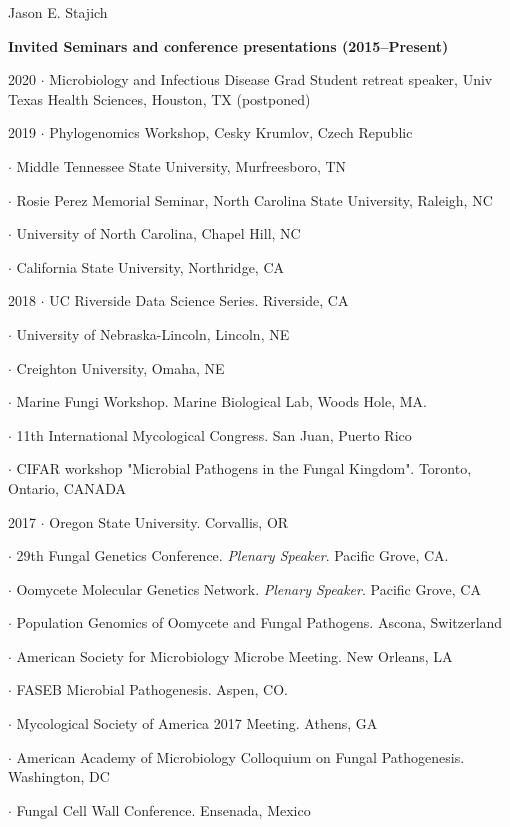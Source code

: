 \documentclass[10pt]{article}
\begin{document}
\begin{cv}{\centerline{Jason E. Stajich}}
\setlength{\cvlabelwidth}{8mm}
\begin{cvlistcompact}{\bf Invited Seminars and conference presentations (2015--Present)}
\item [2020] $\cdot$ Microbiology and Infectious Disease Grad Student retreat speaker, Univ Texas Health Sciences, Houston, TX (postponed)
\item [2019] $\cdot$ Phylogenomics Workshop, Cesky Krumlov, Czech Republic
\item $\cdot$ Middle Tennessee State University, Murfreesboro, TN
\item $\cdot$ Rosie Perez Memorial Seminar, North Carolina State University, Raleigh, NC
\item $\cdot$ University of North Carolina, Chapel Hill, NC
\item $\cdot$ California State University, Northridge, CA
\item [2018] $\cdot$ UC Riverside Data Science Series. Riverside, CA
\item $\cdot$ University of Nebraska-Lincoln, Lincoln, NE
\item $\cdot$ Creighton University, Omaha, NE
\item $\cdot$ Marine Fungi Workshop. Marine Biological Lab, Woods Hole, MA.
\item $\cdot$ 11th International Mycological Congress. San Juan, Puerto Rico
\item $\cdot$ CIFAR workshop "Microbial Pathogens in the Fungal Kingdom". Toronto, Ontario, CANADA
\item [2017] $\cdot$ Oregon State University. Corvallis, OR
\item $\cdot$
  29th Fungal Genetics Conference. \textit{Plenary Speaker}. Pacific Grove,
  CA.
\item $\cdot$ Oomycete Molecular Genetics Network. \textit{Plenary
     Speaker}. Pacific Grove, CA
\item $\cdot$ Population Genomics of Oomycete and Fungal
  Pathogens. Ascona, Switzerland
\item $\cdot$ American Society for Microbiology Microbe Meeting. New Orleans, LA
\item $\cdot$ FASEB Microbial Pathogenesis. Aspen, CO.
\item $\cdot$ Mycological Society of America 2017 Meeting. Athens, GA
\item $\cdot$ American Academy of Microbiology Colloquium on Fungal
  Pathogenesis. Washington, DC
\item $\cdot$ Fungal Cell Wall Conference. Ensenada, Mexico

\end{cvlistcompact}
\end{cv}
\end{document}
